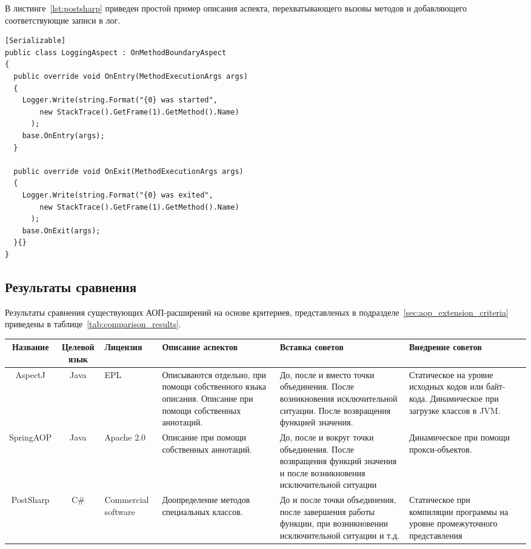   В листинге~\ref{lst:postsharp} приведен простой пример описания аспекта, 
  перехватывающего вызовы методов и добавляющего соответствующие записи в лог.
  \begin{lstlisting}[style={java},  label={lst:postsharp}, caption={Пример 
  описания аспекта при помощи PostSharp.}]
[Serializable]
public class LoggingAspect : OnMethodBoundaryAspect
{
  public override void OnEntry(MethodExecutionArgs args)
  {
    Logger.Write(string.Format("{0} was started",
        new StackTrace().GetFrame(1).GetMethod().Name)
      );
    base.OnEntry(args);
  }
 
  public override void OnExit(MethodExecutionArgs args)
  {
    Logger.Write(string.Format("{0} was exited",
        new StackTrace().GetFrame(1).GetMethod().Name)
      );
    base.OnExit(args);
  }{}
}
  \end{lstlisting}
\subsection{Результаты сравнения}
\label{sub:comparison_results}
Результаты сравнения существующих АОП-расширений на основе критериев,
представленых в подразделе~\ref{sec:aop_extension_criteria} приведены в
таблице~\ref{tab:comparison_results}.

\begin{sidewaystable}
\caption{Результаты сравнения существующих АОП-расширений}
\scriptsize
\begin{tabularx}{\textwidth}{|c|c|X|X|X|X|X|}
\hline
Название & Целевой язык & Лицензия & Описание аспектов & Вставка советов& Внедрение советов \\ \hline
AspectJ & Java & EPL & Описываются отдельно, при помощи собственного языка описания. Описание при помощи собственных аннотаций. & До, после и вместо точки объединения. После возникновения исключительной ситуации. После возвращения функцией значения. & Статическое на уровне исходных кодов или байт-кода. Динамическое при загрузке классов в JVM. \\ \hline
SpringAOP & Java & Apache 2.0 & Описание при помощи собственных аннотаций. & До, после и вокруг точки объединения. После возвращения функций значения и после возникновения исключительной ситуации & Динамическое при помощи прокси-объектов. \\ \hline
PostSharp & C\# & Commercial software & Доопределение методов специальных классов. & До и после точки объединения, после завершения работы функции, при возникновении исключительной ситуации и т.д. & Статическое при компиляции программы на уровне промежуточного представления \\ \hline
\end{tabularx}
\label{tab:comparison_results}
\end{sidewaystable}
